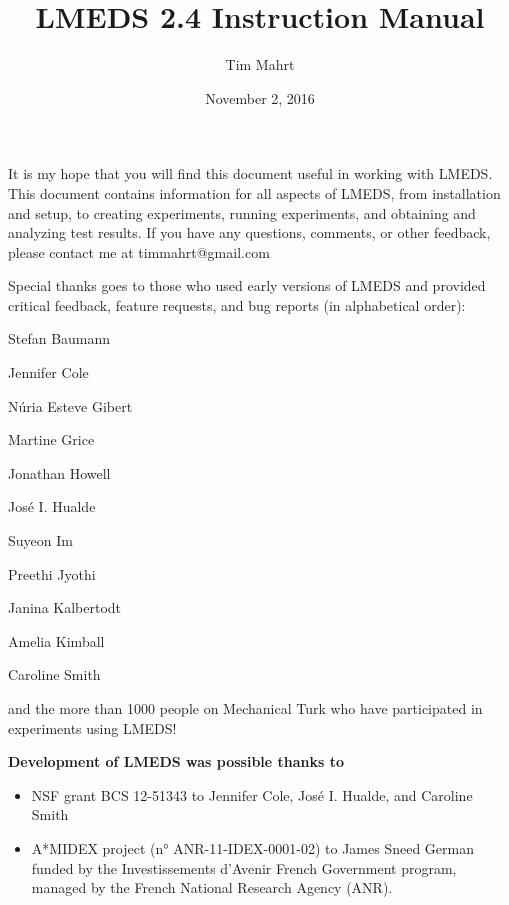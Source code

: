 \documentclass[12pt, oneside]{scrbook}   	%
\title{LMEDS 2.4 Instruction Manual}
\author{Tim Mahrt}
\date{November 2, 2016}
\begin{document}
\maketitle

\newpage

\paragraph{}

It is my hope that you will find this document useful in working with LMEDS. This document contains information for all aspects of LMEDS, from installation and setup, to creating experiments, running experiments, and obtaining and analyzing test results.  If you have any questions, comments, or other feedback, please contact me at timmahrt@gmail.com

\vspace{25mm}

Special thanks goes to those who used early versions of LMEDS and provided critical feedback, feature requests, and bug reports (in alphabetical order):

\vspace{5mm}

Stefan Baumann

Jennifer Cole

Núria Esteve Gibert

Martine Grice

Jonathan Howell

José I. Hualde

Suyeon Im

Preethi Jyothi

Janina Kalbertodt

Amelia Kimball

Caroline Smith

\vspace{5mm}

and the more than 1000 people on Mechanical Turk who have participated in experiments using LMEDS!

\vfill

\begin{tcolorbox}[breakable,colback=white,colframe=green,width=\dimexpr\textwidth+12mm\relax,enlarge left by=-6mm]

\textbf{Development of LMEDS was possible thanks to }
\begin{itemize}
\item NSF grant BCS 12-51343 to
Jennifer Cole, José I. Hualde, and Caroline Smith
\item A*MIDEX project
(n° ANR-11-IDEX-0001-02) to James Sneed German funded by the
Investissements d'Avenir French Government program,
managed by the French National Research Agency (ANR).
\end{itemize}

\end{tcolorbox}

\tableofcontents

\newpage







\end{document}
